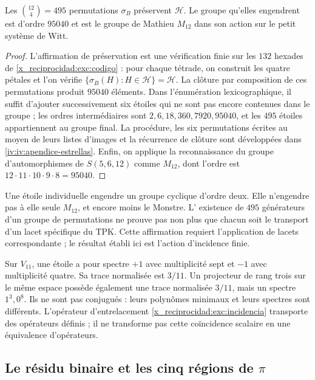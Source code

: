 \begin{proposition}
\label{x_reciprocidad:exc:m12}
Les $\binom{12}4=495$ permutations $\sigma_B$ préservent $\mathcal H$.
Le groupe qu'elles engendrent est d'ordre $95040$ et est le groupe de Mathieu
$M_{12}$ dans son action sur le petit système de Witt.
\end{proposition}

\begin{proof}
L'affirmation de préservation est une vérification finie sur les
$132$ hexades de \eqref{x_reciprocidad:exc:codigo} : pour chaque tétrade, on construit
les quatre pétales et l'on vérifie
$\{\sigma_B(H):H\in\mathcal H\}=\mathcal H$.
La clôture par composition de ces permutations produit $95040$
éléments. Dans l'énumération lexicographique, il suffit d'ajouter successivement
six étoiles qui ne sont pas encore contenues dans le groupe ; les ordres intermédiaires
sont $2,6,18,360,7920,95040$, et les $495$ étoiles appartiennent au groupe
final. La procédure, les six permutations écrites au moyen de leurs
listes d'images et la récurrence de clôture sont développées dans
\ref{iv:iv:apendice-estrellas}. Enfin, on applique la reconnaissance
du groupe d'automorphismes de $S(5,6,12)$ comme $M_{12}$, dont l'ordre est
$12\cdot11\cdot10\cdot9\cdot8=95040$.
\end{proof}

Une étoile individuelle engendre un groupe cyclique d'ordre deux. Elle
n'engendre pas à elle seule $M_{12}$, et encore moins le Monstre. L'
existence de $495$ générateurs d'un groupe de permutations ne prouve pas non plus que
chacun soit le transport d'un lacet spécifique du TPK. Cette affirmation
requiert l'application de lacets correspondante ; le résultat établi ici
est l'action d'incidence finie.

\begin{remark}
Sur $V_{11}$, une étoile a pour spectre $+1$ avec multiplicité sept
et $-1$ avec multiplicité quatre. Sa trace normalisée est $3/11$.
Un projecteur de rang trois sur le même espace possède également une trace
normalisée $3/11$, mais un spectre $1^3,0^8$. Ils ne sont pas conjugués : leurs
polynômes minimaux et leurs spectres sont différents. L'opérateur d'entrelacement
\eqref{x_reciprocidad:exc:incidencia} transporte des opérateurs définis ; il ne transforme pas
cette coïncidence scalaire en une équivalence d'opérateurs.
\end{remark}

\subsection{Le résidu binaire et les cinq régions de \texorpdfstring{$\pi$}{pi}}
\label{x_reciprocidad:exc:cinco-regiones}

